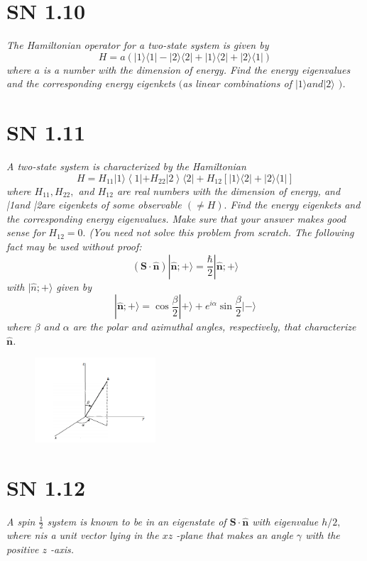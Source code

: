 \documentclass{article}
\begin{document}
\newpage
\section{SN 1.10}
\textit{The Hamiltonian operator for a two-state system is given by
$$
H=a(|1\rangle\langle 1|-| 2\rangle\langle 2|+| 1\rangle\langle 2|+| 2\rangle\langle 1|)
$$
where $a$ is a number with the dimension of energy. Find the energy eigenvalues and the corresponding energy eigenkets $($as linear combinations of $|1\rangle and |2\rangle$ $)$.}

\newpage

\section{SN 1.11}
\textit{A two-state system is characterized by the Hamiltonian
$$
H=H_{11}|1\rangle\left\langle 1\left|+H_{22}\right| 2\right\rangle\langle 2|+H_{12}[|1\rangle\langle 2|+| 2\rangle\langle 1|]
$$
where $H_{11}, H_{22},$ and $H_{12}$ are real numbers with the dimension of energy, and |1\rangle and |2\rangle are eigenkets of some observable $(\neq H) .$ Find the energy eigenkets and the corresponding energy eigenvalues. Make sure that your answer makes good sense for $H_{12}=0 .$ (You need not solve this problem from scratch. The following fact may be used without proof:
$$
(\mathbf{S} \cdot \hat{\mathbf{n}})|\hat{\mathbf{n}} ;+\rangle=\frac{\hbar}{2}|\hat{\mathbf{n}} ;+\rangle
$$
with $|\hat{n} ;+\rangle$ given by
$$
|\hat{\mathbf{n}} ;+\rangle=\cos \frac{\beta}{2}|+\rangle+e^{i \alpha} \sin \frac{\beta}{2}|-\rangle
$$
where $\beta$ and $\alpha$ are the polar and azimuthal angles, respectively, that characterize $\hat{\mathbf{n}}$. }

\begin{figure}[h!]
    \centering
    \includegraphics[width=0.4\textwidth]{figures/problem5.png}
    \label{fig:my_label}
\end{figure}

\newpage

\section{SN 1.12}
\textit{A spin $\frac{1}{2}$ system is known to be in an eigenstate of $\mathbf{S} \cdot \hat{\mathbf{n}}$ with eigenvalue $h / 2,$ where nis a unit vector lying in the $x z$ -plane that makes an angle $\gamma$ with the positive $z$ -axis.}
\end{document}
